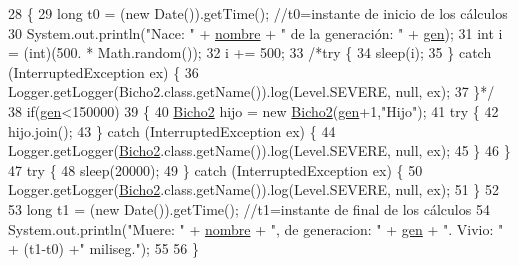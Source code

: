 \begin{DoxyCode}
28                       \{
29         \textcolor{keywordtype}{long} t0 = (\textcolor{keyword}{new} Date()).getTime(); \textcolor{comment}{//t0=instante de inicio de los cálculos}
30         System.out.println(\textcolor{stringliteral}{"Nace: "} + \mbox{\hyperlink{class_ejercicio4_1_1_bicho2_a2afa745208a498ecffc1b2843bc0da82}{nombre}} + \textcolor{stringliteral}{" de la generación: "} + \mbox{\hyperlink{class_ejercicio4_1_1_bicho2_a52c8486d264ae216ff0dd1d6c08f8916}{gen}});
31         \textcolor{keywordtype}{int} i = (int)(500. * Math.random());
32         i += 500;
33         \textcolor{comment}{/*try \{}
34 \textcolor{comment}{            sleep(i);}
35 \textcolor{comment}{        \} catch (InterruptedException ex) \{}
36 \textcolor{comment}{            Logger.getLogger(Bicho2.class.getName()).log(Level.SEVERE, null, ex);}
37 \textcolor{comment}{        \}*/}
38         \textcolor{keywordflow}{if}(\mbox{\hyperlink{class_ejercicio4_1_1_bicho2_a52c8486d264ae216ff0dd1d6c08f8916}{gen}}<150000)
39         \{
40             \mbox{\hyperlink{class_ejercicio4_1_1_bicho2_a0317dd47a7f91ecddd5985c6a328afd4}{Bicho2}} hijo = \textcolor{keyword}{new} \mbox{\hyperlink{class_ejercicio4_1_1_bicho2_a0317dd47a7f91ecddd5985c6a328afd4}{Bicho2}}(\mbox{\hyperlink{class_ejercicio4_1_1_bicho2_a52c8486d264ae216ff0dd1d6c08f8916}{gen}}+1,\textcolor{stringliteral}{"Hijo"});
41             \textcolor{keywordflow}{try} \{
42                 hijo.join();
43             \} \textcolor{keywordflow}{catch} (InterruptedException ex) \{
44                 Logger.getLogger(\mbox{\hyperlink{class_ejercicio4_1_1_bicho2_a0317dd47a7f91ecddd5985c6a328afd4}{Bicho2}}.class.getName()).log(Level.SEVERE, null, ex);
45             \}
46         \}
47         \textcolor{keywordflow}{try} \{
48             sleep(20000);
49         \} \textcolor{keywordflow}{catch} (InterruptedException ex) \{
50             Logger.getLogger(\mbox{\hyperlink{class_ejercicio4_1_1_bicho2_a0317dd47a7f91ecddd5985c6a328afd4}{Bicho2}}.class.getName()).log(Level.SEVERE, null, ex);
51         \}
52         
53         \textcolor{keywordtype}{long} t1 = (\textcolor{keyword}{new} Date()).getTime(); \textcolor{comment}{//t1=instante de final de los cálculos}
54         System.out.println(\textcolor{stringliteral}{"Muere: "} + \mbox{\hyperlink{class_ejercicio4_1_1_bicho2_a2afa745208a498ecffc1b2843bc0da82}{nombre}} + \textcolor{stringliteral}{", de generacion: "} + \mbox{\hyperlink{class_ejercicio4_1_1_bicho2_a52c8486d264ae216ff0dd1d6c08f8916}{gen}} + \textcolor{stringliteral}{". Vivio: "} + (t1-t0) 
      +\textcolor{stringliteral}{" miliseg."});
55         
56     \}
\end{DoxyCode}


